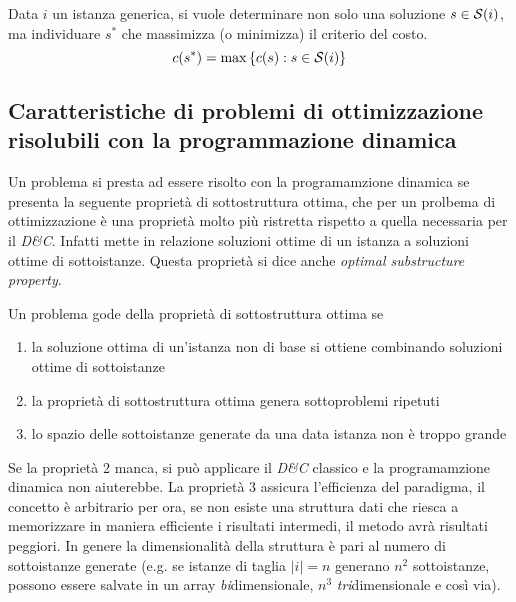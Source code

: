 Data $i$ un istanza generica, si vuole determinare non solo una soluzione $s \in \mathcal{S}{}(i)$, ma individuare $s^*$ che massimizza (o minimizza) il criterio del costo.
\begin{equation*}
    c(s^*) = \max \left\{ c(s) : s \in \mathcal{S}{}(i) \right\}
\end{equation*}

\subsection{Caratteristiche di problemi di ottimizzazione risolubili con la programmazione dinamica}

Un problema si presta ad essere risolto con la programamzione dinamica se presenta la seguente proprietà di sottostruttura ottima, che per un prolbema di ottimizzazione è una proprietà molto più ristretta rispetto a quella necessaria per il \emph{D\&C}. Infatti mette in relazione soluzioni ottime di un istanza a soluzioni ottime di sottoistanze. Questa proprietà si dice anche \emph{optimal substructure property}.




\begin{definition}
    Un problema gode della proprietà di sottostruttura ottima se
    \begin{enumerate}
        \item la soluzione ottima di un'istanza non di base si ottiene combinando soluzioni ottime di sottoistanze
        \item la proprietà di sottostruttura ottima genera sottoproblemi ripetuti
        \item lo spazio delle sottoistanze generate da una data istanza non è troppo grande
    \end{enumerate}
\end{definition}

Se la proprietà 2 manca, si può applicare il \emph{D\&C} classico e la programamzione dinamica non aiuterebbe.
La proprietà 3 assicura l'efficienza del paradigma, il concetto è arbitrario per ora, se non esiste una struttura dati che riesca a memorizzare in maniera efficiente i risultati intermedi, il metodo avrà risultati peggiori. In genere la dimensionalità della struttura è pari al numero di sottoistanze generate (e.g. se istanze di taglia $|i|=n$ generano $n^2$ sottoistanze, possono essere salvate in un array \emph{bi}dimensionale, $n^3$ \emph{tri}dimensionale e così via).

